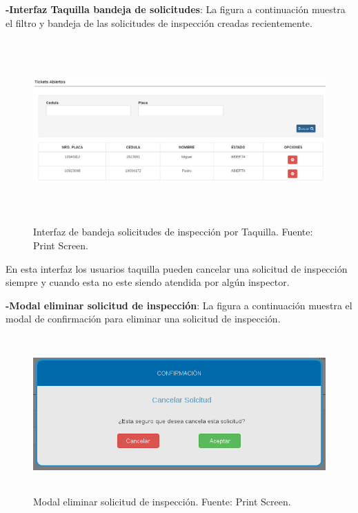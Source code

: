 \textbf{-Interfaz Taquilla bandeja de solicitudes}: La figura a continuación muestra el filtro y bandeja de las solicitudes de inspección creadas recientemente.

\begin{figure}[H]
\begin{center}
	\includegraphics[width=\textwidth,height=7cm]{img/interfaces/bandeja_solicitudes_creadas.png}
\end{center}
\caption{Interfaz de bandeja solicitudes de inspección por Taquilla. Fuente: Print Screen.}
\label{fig:interfaz_bandeja_solicitudes_inspeccion_taquilla}
\end{figure}

En esta interfaz los usuarios taquilla pueden cancelar una solicitud de inspección siempre y cuando esta no este siendo atendida por algún inspector.



\textbf{-Modal eliminar solicitud de inspección}: La figura a continuación muestra el modal de confirmación para eliminar una solicitud de inspección.

\begin{figure}[H]
\begin{center}
	\includegraphics[width=14cm,height=6cm]{img/interfaces/modal_confirmacion_eliminar_solicitud_creada.png}
\end{center}
\caption{Modal eliminar solicitud de inspección. Fuente: Print Screen.}
\label{fig:modal_confirmacion_eliminar_solicitud}
\end{figure}


